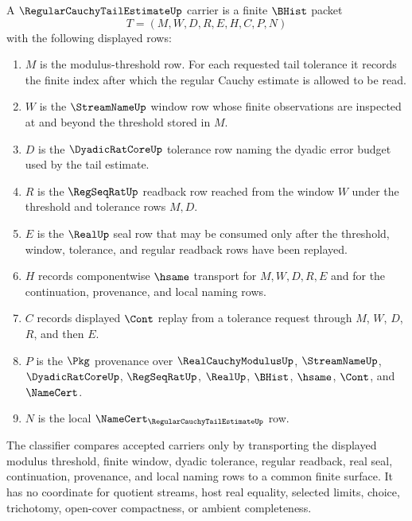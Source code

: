 \begin{definition}
\label{def:regular-cauchy-tail-estimate-carrier}
A $\RegularCauchyTailEstimateUp$ carrier is a finite $\BHist$ packet
$$
T=(M,W,D,R,E,H,C,P,N)
$$
with the following displayed rows:
\begin{enumerate}
\item $M$ is the modulus-threshold row. For each requested tail tolerance it
records the finite index after which the regular Cauchy estimate is allowed to
be read.
\item $W$ is the $\StreamNameUp$ window row whose finite observations are
inspected at and beyond the threshold stored in $M$.
\item $D$ is the $\DyadicRatCoreUp$ tolerance row naming the dyadic error
budget used by the tail estimate.
\item $R$ is the $\RegSeqRatUp$ readback row reached from the window $W$ under
the threshold and tolerance rows $M,D$.
\item $E$ is the $\RealUp$ seal row that may be consumed only after the
threshold, window, tolerance, and regular readback rows have been replayed.
\item $H$ records componentwise $\hsame$ transport for $M,W,D,R,E$ and for the
continuation, provenance, and local naming rows.
\item $C$ records displayed $\Cont$ replay from a tolerance request through
$M$, $W$, $D$, $R$, and then $E$.
\item $P$ is the $\Pkg$ provenance over $\RealCauchyModulusUp$,
$\StreamNameUp$, $\DyadicRatCoreUp$, $\RegSeqRatUp$, $\RealUp$, $\BHist$,
$\hsame$, $\Cont$, and $\NameCert$.
\item $N$ is the local $\NameCert_{\RegularCauchyTailEstimateUp}$ row.
\end{enumerate}
The classifier compares accepted carriers only by transporting the displayed
modulus threshold, finite window, dyadic tolerance, regular readback, real seal,
continuation, provenance, and local naming rows to a common finite surface. It
has no coordinate for quotient streams, host real equality, selected limits,
choice, trichotomy, open-cover compactness, or ambient completeness.
\end{definition}

